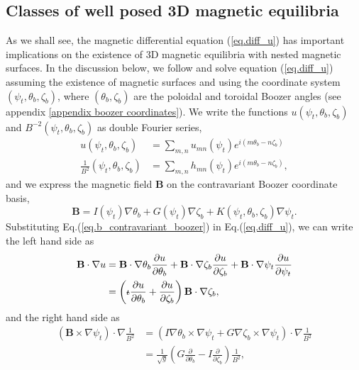 \documentclass[my_thesis.tex]{subfiles}
\begin{document}
\subsection{Classes of well posed 3D magnetic equilibria}\label{sec. diverging currents}

As we shall see, the magnetic differential equation (\ref{eq.diff_u}) has important implications on the existence of 3D magnetic equilibria with nested magnetic surfaces. In the discussion below, we follow \citet{helanderTheoryPlasmaConfinement2014} and solve equation (\ref{eq.diff_u}) assuming the existence of magnetic surfaces and using the coordinate system $(\psi_t,\theta_b,\zeta_b)$, where $(\theta_b,\zeta_b)$ are the poloidal and toroidal Boozer angles (see appendix \ref{appendix boozer coordinates}). We write the functions $u(\psi_t,\theta_b,\zeta_b)$ and $B^{-2}(\psi_t,\theta_b,\zeta_b)$ as double Fourier series,
\begin{align}
	u(\psi_t,\theta_b,\zeta_b) &= \sum_{m,n} u_{mn}(\psi_t) e^{i(m\theta_b-n\zeta_b)}\label{eq.u_fourier_expansion}\\
	\frac{1}{B^2}(\psi_t,\theta_b,\zeta_b) &= \sum_{m,n} h_{mn}(\psi_t) e^{i(m\theta_b-n\zeta_b)}\label{eq.b_fourier_expansion},
\end{align}
and we express the magnetic field $\mathbf{B}$ on the contravariant Boozer coordinate basis,
\begin{equation}
	\mathbf{B} = I(\psi_t)\nabla\theta_b + G(\psi_t)\nabla\zeta_b + K(\psi_t,\theta_b,\zeta_b)\nabla\psi_t.\label{eq.b_contravariant_boozer}
\end{equation}
Substituting Eq.(\ref{eq.b_contravariant_boozer}) in Eq.(\ref{eq.diff_u}), we can write the left hand side as
\begin{align}
	\mathbf{B}\cdot\nabla u &= \mathbf{B}\cdot\nabla\theta_b\frac{\partial u}{\partial \theta_b} + \mathbf{B}\cdot\nabla\zeta_b\frac{\partial u}{\partial \zeta_b} + \mathbf{B}\cdot\nabla\psi_t\frac{\partial u}{\partial \psi_t} \\
	&= \left(\text{$\iota\!\!$-} \frac{\partial u}{\partial \theta_b} + \frac{\partial u}{\partial \zeta_b}\right)\mathbf{B}\cdot\nabla\zeta_b,
\end{align}
and the right hand side as
\begin{align}
	\left(\mathbf{B}\times\nabla\psi_t\right)\cdot\nabla \frac{1}{B^2} &= \left(I\nabla\theta_b\times\nabla\psi_t + G\nabla\zeta_b\times\nabla\psi_t\right)\cdot\nabla\frac{1}{B^2}\\
	&= \frac{1}{\sqrt{g}}\left(G\frac{\partial}{\partial\theta_b} - I \frac{\partial}{\partial \zeta_b}\right)\frac{1}{B^2},
\end{align}
\end{document}
